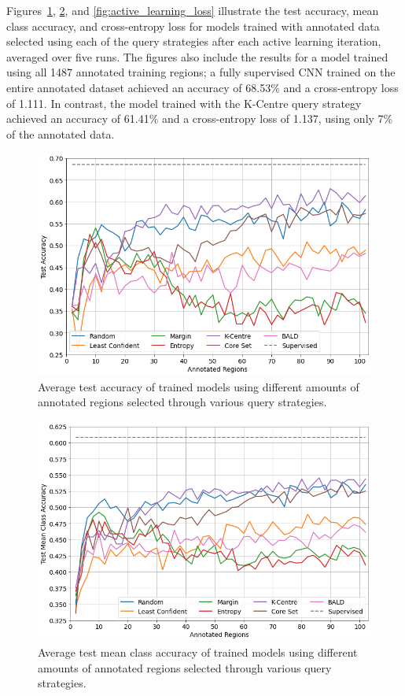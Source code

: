 Figures~\ref{fig:active_learning_accuracy}, \ref{fig:active_learning_mean_class_accuracy}, and \ref{fig:active_learning_loss} illustrate the test accuracy, mean class accuracy, and cross-entropy loss for models trained with annotated data selected using each of the query strategies after each active learning iteration, averaged over five runs. The figures also include the results for a model trained using all 1487 annotated training regions; a fully supervised CNN trained on the entire annotated dataset achieved an accuracy of 68.53\% and a cross-entropy loss of 1.111. In contrast, the model trained with the K-Centre query strategy achieved an accuracy of 61.41\% and a cross-entropy loss of 1.137, using only 7\% of the annotated data.

\begin{figure}
	\centering
	\includegraphics[width=\textwidth]{images/active_learning_accuracy.png}
	\caption{Average test accuracy of trained models using different amounts of annotated regions selected through various query strategies.}
	\label{fig:active_learning_accuracy}
\end{figure}

\begin{figure}
	\centering
	\includegraphics[width=\textwidth]{images/active_learning_mean_class_accuracy.png}
	\caption{Average test mean class accuracy of trained models using different amounts of annotated regions selected through various query strategies.}
	\label{fig:active_learning_mean_class_accuracy}
\end{figure}

